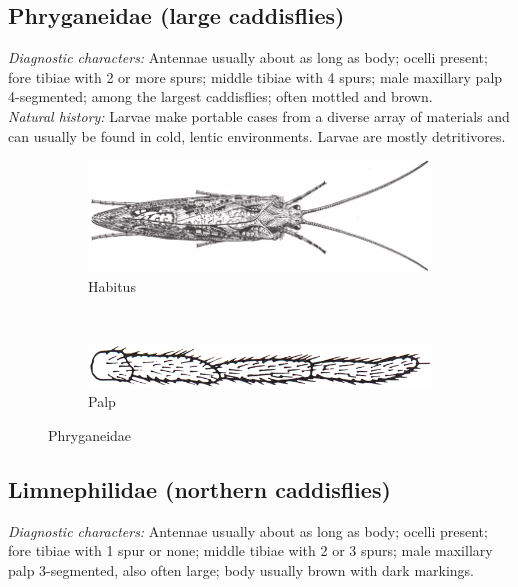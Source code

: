 \documentclass[letterpaper, 11pt]{article}
\begin{document}
\subsection{Phryganeidae (large caddisflies)}
\noindent{}\textit{Diagnostic characters:} Antennae usually about as long as body; ocelli present; fore tibiae with 2 or more spurs; middle tibiae with 4 spurs; male maxillary palp 4-segmented; among the largest caddisflies; often mottled and brown.\\

\noindent{}\textit{Natural history:} Larvae make portable cases from a diverse array of materials and can usually be found in cold, lentic environments. Larvae are mostly detritivores.

\begin{figure}[ht!]
    \centering
    \begin{subfigure}[ht!]{0.6\textwidth}
        \includegraphics[width=\textwidth]{TrichoImage00}
        \caption{Habitus}
        \label{fig:phrygan1}
    \end{subfigure}
    ~ %
    \begin{subfigure}[ht!]{0.25\textwidth}
        \includegraphics[width=\textwidth]{TrichoImage01}
        \caption{Palp}
        \label{fig:phrygan2}
    \end{subfigure}
    \caption{Phryganeidae}\label{fig:phrygan}
\end{figure}

\subsection{Limnephilidae (northern caddisflies)}
\noindent{}\textit{Diagnostic characters:} Antennae usually about as long as body; ocelli present; fore tibiae with 1 spur or none; middle tibiae with 2 or 3 spurs; male maxillary palp 3-segmented, also often large; body usually brown with dark markings.\\
\end{document}
